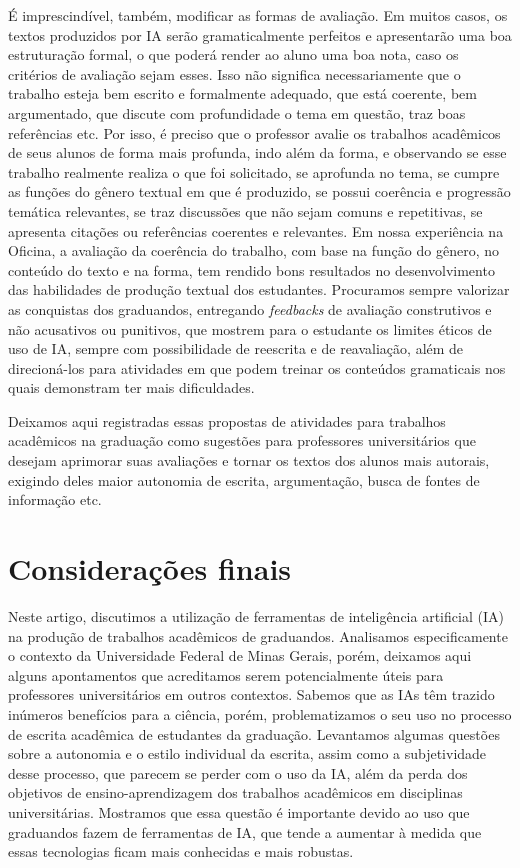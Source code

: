 \documentclass[portuguese]{textolivre}
\begin{document}
É imprescindível, também, modificar as formas de avaliação. Em muitos casos, os textos produzidos por IA serão gramaticalmente perfeitos e apresentarão uma boa estruturação formal, o que poderá render ao aluno uma boa nota, caso os critérios de avaliação sejam esses. Isso não significa necessariamente que o trabalho esteja bem escrito e formalmente adequado, que está coerente, bem argumentado, que discute com profundidade o tema em questão, traz boas referências etc. Por isso, é preciso que o professor avalie os trabalhos acadêmicos de seus alunos de forma mais profunda, indo além da forma, e observando se esse trabalho realmente realiza o que foi solicitado, se aprofunda no tema, se cumpre as funções do gênero textual em que é produzido, se possui coerência e progressão temática relevantes, se traz discussões que não sejam comuns e repetitivas, se apresenta citações ou referências coerentes e relevantes. Em nossa experiência na Oficina, a avaliação da coerência do trabalho, com base na função do gênero, no conteúdo do texto e na forma, tem rendido bons resultados no desenvolvimento das habilidades de produção textual dos estudantes. Procuramos sempre valorizar as conquistas dos graduandos, entregando \textit{feedbacks} de avaliação construtivos e não acusativos ou punitivos, que mostrem para o estudante os limites éticos de uso de IA, sempre com possibilidade de reescrita e de reavaliação, além de direcioná-los para atividades em que podem treinar os conteúdos gramaticais nos quais demonstram ter mais dificuldades.

Deixamos aqui registradas essas propostas de atividades para trabalhos acadêmicos na graduação como sugestões para professores universitários que desejam aprimorar suas avaliações e tornar os textos dos alunos mais autorais, exigindo deles maior autonomia de escrita, argumentação, busca de fontes de informação etc.

\section{Considerações finais}
Neste artigo, discutimos a utilização de ferramentas de inteligência artificial (IA) na produção de trabalhos acadêmicos de graduandos. Analisamos especificamente o contexto da Universidade Federal de Minas Gerais, porém, deixamos aqui alguns apontamentos que acreditamos serem potencialmente úteis para professores universitários em outros contextos. Sabemos que as IAs têm trazido inúmeros benefícios para a ciência, porém, problematizamos o seu uso no processo de escrita acadêmica de estudantes da graduação. Levantamos algumas questões sobre a autonomia e o estilo individual da escrita, assim como a subjetividade desse processo, que parecem se perder com o uso da IA, além da perda dos objetivos de ensino-aprendizagem dos trabalhos acadêmicos em disciplinas universitárias. Mostramos que essa questão é importante devido ao uso que graduandos fazem de ferramentas de IA, que tende a aumentar à medida que essas tecnologias ficam mais conhecidas e mais robustas.
\end{document}
